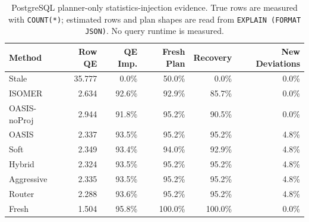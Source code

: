 \begin{table}[t]
  \centering
  \small
  \caption{PostgreSQL planner-only statistics-injection evidence. True rows are measured with \texttt{COUNT(*)}; estimated rows and plan shapes are read from \texttt{EXPLAIN (FORMAT JSON)}. No query runtime is measured.}
  \label{tab:postgres_planner_stats_injection}
  \setlength{\tabcolsep}{4pt}
  \begin{tabular}{lrrrrr}
    \toprule
    Method & Row QE & QE Imp. & Fresh Plan & Recovery & New Deviations \\
    \midrule
    Stale & 35.777 & 0.0\% & 50.0\% & 0.0\% & 0.0\% \\
    ISOMER & 2.634 & 92.6\% & 92.9\% & 85.7\% & 0.0\% \\
    OASIS-noProj & 2.944 & 91.8\% & 95.2\% & 90.5\% & 0.0\% \\
    OASIS & 2.337 & 93.5\% & 95.2\% & 95.2\% & 4.8\% \\
    Soft & 2.349 & 93.4\% & 94.0\% & 92.9\% & 4.8\% \\
    Hybrid & 2.324 & 93.5\% & 95.2\% & 95.2\% & 4.8\% \\
    Aggressive & 2.335 & 93.5\% & 95.2\% & 95.2\% & 4.8\% \\
    Router & 2.288 & 93.6\% & 95.2\% & 95.2\% & 4.8\% \\
    Fresh & 1.504 & 95.8\% & 100.0\% & 100.0\% & 0.0\% \\
    \bottomrule
  \end{tabular}
\end{table}
